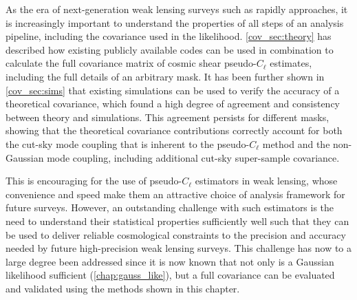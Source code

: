 As the era of next-generation weak lensing surveys such as \Euclid{} rapidly approaches, it is increasingly important to understand the properties of all steps of an analysis pipeline, including the covariance used in the likelihood.
\autoref{cov_sec:theory} has described how existing publicly available codes can be used in combination to calculate the full covariance matrix of cosmic shear pseudo-$C_\ell$ estimates, including the full details of an arbitrary mask.
It has been further shown in \autoref{cov_sec:sims} that existing simulations can be used to verify the accuracy of a theoretical covariance, which found a high degree of agreement and consistency between theory and simulations. This agreement persists for different masks, showing that the theoretical covariance contributions correctly account for both the cut-sky mode coupling that is inherent to the pseudo-$C_\ell$ method and the non-Gaussian mode coupling, including additional cut-sky super-sample covariance.

This is encouraging for the use of pseudo-$C_\ell$ estimators in weak lensing, whose convenience and speed make them an attractive choice of analysis framework for future surveys. However, an outstanding challenge with such estimators is the need to understand their statistical properties sufficiently well such that they can be used to deliver reliable cosmological constraints to the precision and accuracy needed by future high-precision weak lensing surveys. This challenge has now to a large degree been addressed since it is now known that not only is a Gaussian likelihood sufficient (\autoref{chap:gauss_like}), but a full covariance can be evaluated and validated using the methods shown in this chapter.

